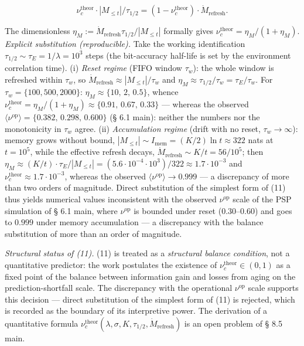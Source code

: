 \documentclass[pdflatex,sn-mathphys-ay]{sn-jnl}
\begin{document}
\[\nu_c^{\text{theor}} \cdot |M_{\le t}| / \tau_{1/2} = (1 - \nu_c^{\text{theor}}) \cdot \dot{M}_{\text{refresh}}.\]



The dimensionless \(\eta_M := \dot{M}_{\text{refresh}} \tau_{1/2} / |M_{\le t}|\) formally gives \(\nu_c^{\text{theor}} = \eta_M / (1 + \eta_M)\). \emph{Explicit substitution (reproducible).} Take the working identification \(\tau_{1/2} \sim \tau_E = 1/\lambda = 10^3\) steps (the bit-accuracy half-life is set by the environment correlation time). (i) \emph{Reset regime} (FIFO window \(\tau_w\)): the whole window is refreshed within \(\tau_w\), so \(\dot M_{\text{refresh}} \approx |M_{\le t}|/\tau_w\) and \(\eta_M \approx \tau_{1/2}/\tau_w = \tau_E/\tau_w\). For \(\tau_w = \{100, 500, 2000\}\): \(\eta_M \approx \{10,\, 2,\, 0.5\}\), whence \(\nu_c^{\text{theor}} = \eta_M/(1+\eta_M) \approx \{0.91,\, 0.67,\, 0.33\}\) --- whereas the observed \(\langle\nu^{\text{op}}\rangle = \{0.382,\, 0.298,\, 0.600\}\) (§ 6.1 main): neither the numbers nor the monotonicity in \(\tau_w\) agree. (ii) \emph{Accumulation regime} (drift with no reset, \(\tau_w \to \infty\)): memory grows without bound, \(|M_{\le t}| \sim I_{\text{mem}} = (K/2)\ln t \approx 322\) nats at \(t = 10^5\), while the effective refresh decays, \(\dot M_{\text{refresh}} \sim K/t = 56/10^5\); then \(\eta_M \approx (K/t)\cdot\tau_E/|M_{\le t}| = (5.6\cdot10^{-4}\cdot10^3)/322 \approx 1.7\cdot10^{-3}\) and \(\nu_c^{\text{theor}} \approx 1.7\cdot10^{-3}\), whereas the observed \(\langle\nu^{\text{op}}\rangle \to 0.999\) --- a discrepancy of more than two orders of magnitude. Direct substitution of the simplest form of (11) thus yields numerical values inconsistent with the observed \(\nu^{\text{op}}\) scale of the PSP simulation of § 6.1 main, where \(\nu^{\text{op}}\) is bounded under reset (\(0.30\)--\(0.60\)) and goes to \(0.999\) under memory accumulation --- a discrepancy with the balance substitution of more than an order of magnitude.



\emph{Structural status of (11).} (11) is treated as a \emph{structural balance condition}, not a quantitative predictor: the work postulates the existence of \(\nu_c^{\text{theor}} \in (0, 1)\) as a fixed point of the balance between information gain and losses from aging on the prediction-shortfall scale. The discrepancy with the operational \(\nu^{\text{op}}\) scale supports this decision --- direct substitution of the simplest form of (11) is rejected, which is recorded as the boundary of its interpretive power. The derivation of a quantitative formula \(\nu_c^{\text{theor}}(\lambda, \sigma, K, \tau_{1/2}, \dot M_{\text{refresh}})\) is an open problem of § 8.5 main.
\end{document}
